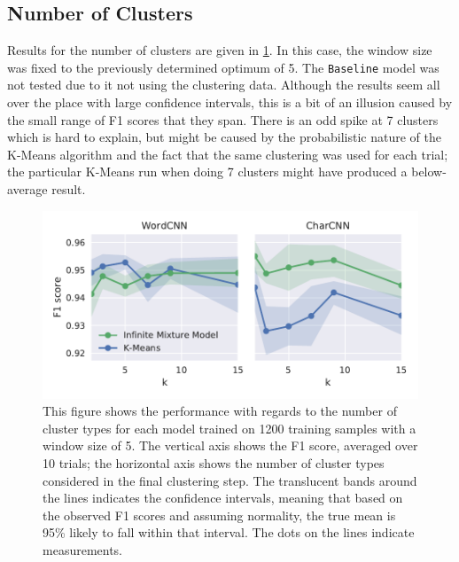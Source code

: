 \subsection{Number of Clusters}
Results for the number of clusters are given in \cref{fig:numcluster}. In
this case, the window size was fixed to the previously determined optimum of 5.
The \texttt{Baseline} model was not tested due to it not using the clustering
data.  Although the results seem all over the place with large confidence
intervals, this is a bit of an illusion caused by the small range of F1 scores
that they span. There is an odd spike at 7 clusters which is hard to explain,
but might be caused by the probabilistic nature of the K-Means algorithm and the
fact that the same clustering was used for each trial; the particular K-Means
run when doing 7 clusters might have produced a below-average result.
\begin{figure}[tb]
  \centering
  \includegraphics[width=\textwidth]{figures/results/2000-numclusters-old/tseries_f1.pdf}
  \caption{This figure shows the performance with regards to the number of
    cluster types for each model trained on 1200 training samples with a window
    size of 5.  The vertical axis shows the F1 score, averaged over 10 trials;
    the horizontal axis shows the number of cluster types considered in the
    final clustering step.  The translucent bands around the lines indicates the
    confidence intervals, meaning that based on the observed F1 scores and
    assuming normality, the true mean is 95\% likely to fall within that interval.
    The dots on the lines indicate measurements.\label{fig:numcluster}}
\end{figure}


